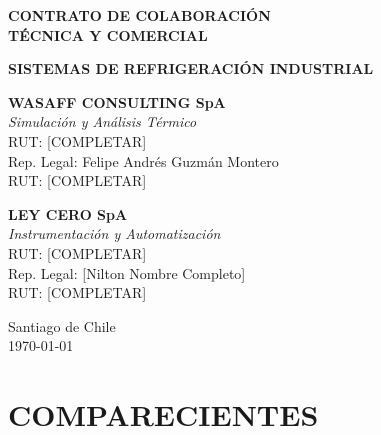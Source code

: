\documentclass[11pt,letterpaper]{article}
\begin{document}
\begin{titlepage}
\centering
\vspace*{2cm}

{\Huge\bfseries\color{wasaffblue} CONTRATO DE COLABORACIÓN\\[0.5cm] TÉCNICA Y COMERCIAL\par}

\vspace{1.5cm}

{\Large\textbf{SISTEMAS DE REFRIGERACIÓN INDUSTRIAL}\par}

\vspace{3cm}

\begin{minipage}{0.45\textwidth}
\centering
\textbf{\Large WASAFF CONSULTING SpA}\\[0.3cm]
\textit{Simulación y Análisis Térmico}\\[0.2cm]
\small RUT: [COMPLETAR]\\
Rep. Legal: Felipe Andrés Guzmán Montero\\
RUT: [COMPLETAR]
\end{minipage}%
\hfill
\begin{minipage}{0.45\textwidth}
\centering
\textbf{\Large LEY CERO SpA}\\[0.3cm]
\textit{Instrumentación y Automatización}\\[0.2cm]
\small RUT: [COMPLETAR]\\
Rep. Legal: [Nilton Nombre Completo]\\
RUT: [COMPLETAR]
\end{minipage}

\vfill

{\large Santiago de Chile\\[0.2cm] \today\par}

\end{titlepage}


\section*{COMPARECIENTES}
\end{document}
